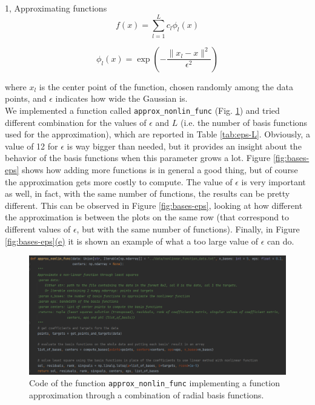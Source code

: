 \documentclass[10pt,a4paper]{article}
\begin{document}
\begin{task}{1, Approximating functions}
\begin{equation}\label{eq:approx-with-radial-basis}
    f(x) = \sum_{l=1}^L c_l \phi_l(x)
\end{equation}

\begin{equation}\label{eq:radial-basis}
    \phi_l(x) = \exp \left(- \frac{\|x_l - x\|^2}{\epsilon^2}\right)
\end{equation}

where $x_l$ is the center point of the function, chosen randomly among the data points, and $\epsilon$ indicates how wide the Gaussian is.\\
We implemented a function called \texttt{approx\_nonlin\_func} (Fig. \ref{fig:approx-nonlin-func}) and tried different combination for the values of $\epsilon$ and $L$ (i.e. the number of basis functions used for the approximation), which are reported in Table \ref{tab:eps-L}.
Obviously, a value of 12 for $\epsilon$ is way bigger than needed, but it provides an insight about the behavior of the basis functions when this parameter grows a lot.
Figure \ref{fig:bases-eps} shows how adding more functions is in general a good thing, but of course the approximation gets more costly to compute.
The value of $\epsilon$ is very important as well, in fact, with the same number of functions, the results can be pretty different.
This can be observed in Figure \ref{fig:bases-eps}, looking at how different the approximation is between the plots on the same row (that correspond to different values of $\epsilon$, but with the same number of functions).
Finally, in Figure \hyperref[fig:bases-eps]{\ref{fig:bases-eps}(e)}
it is shown an example of what a too large value of $\epsilon$ can do.

\begin{figure}[H]
    \centering
    \includegraphics[width=1.0\textwidth]{images/approx_nonlin_func.png}
    \caption{Code of the function \texttt{approx\_nonlin\_func} implementing a function approximation through a combination of radial basis functions.}
    \label{fig:approx-nonlin-func}
\end{figure}


\end{task}
\end{document}
